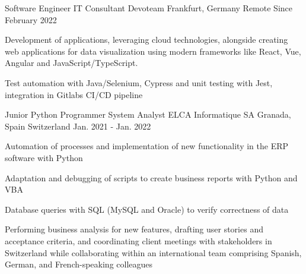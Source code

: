 

\begin{cventries}

  \cventry
    {Software Engineer {\enskip\cdotp\enskip} IT Consultant} %
    {Devoteam} %
    {Frankfurt, Germany {\enskip\cdotp\enskip} Remote} %
    {Since February 2022} %
    {
      \begin{cvitems} %
        \item {Development of applications, leveraging cloud technologies, alongside creating web applications for data visualization using modern frameworks like React, Vue, Angular and JavaScript/TypeScript.}
        \item {Test automation with Java/Selenium, Cypress and unit testing with Jest, integration in Gitlabs CI/CD pipeline}
      \end{cvitems}
    }

  \cventry
    {Junior Python Programmer {\enskip\cdotp\enskip} System Analyst} %
    {ELCA Informatique SA} %
    {Granada, Spain {\enskip\cdotp\enskip} Switzerland} %
    {Jan. 2021 - Jan. 2022} %
    {
      \begin{cvitems} %
        \item {Automation of processes and implementation of new functionality in the ERP software with Python}
        \item {Adaptation and debugging of scripts to create business reports with Python and VBA}
        \item {Database queries with SQL (MySQL and Oracle) to verify correctness of data}
        \item {Performing business analysis for new features, drafting user stories and acceptance criteria, and coordinating client meetings with stakeholders in Switzerland while collaborating within an international team comprising Spanish, German, and French-speaking colleagues}
      \end{cvitems}
    }


\end{cventries}
